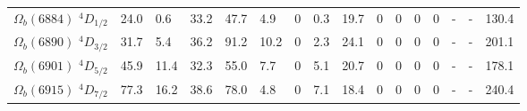 \begin{tabular}{c |  p{0.58cm}  p{0.58cm}  p{0.58cm}  p{0.58cm}  p{0.58cm}  p{0.58cm}  p{0.58cm}  p{0.58cm}  p{0.58cm}  p{0.58cm}  p{0.58cm}  p{0.58cm}  p{0.58cm}  p{0.58cm}p{0.75cm}}
$\Omega_b(6884)$ $^{4}D_{1/2}$&24.0   &0.6   &33.2   &47.7   &4.9   &$0$   &0.3   &19.7   &$0$   &$0$   &$0$   &$0$   &-   &-   &130.4  \\
$\Omega_b(6890)$ $^{4}D_{3/2}$&31.7   &5.4   &36.2   &91.2   &10.2   &$0$   &2.3   &24.1   &$0$   &$0$   &$0$   &$0$   &-   &-   &201.1  \\
$\Omega_b(6901)$ $^{4}D_{5/2}$&45.9   &11.4   &32.3   &55.0   &7.7   &$0$   &5.1   &20.7   &$0$   &$0$   &$0$   &$0$   &-   &-   &178.1  \\
$\Omega_b(6915)$ $^{4}D_{7/2}$&77.3   &16.2   &38.6   &78.0   &4.8   &$0$   &7.1   &18.4   &$0$   &$0$   &$0$   &$0$   &-   &-   &240.4  \\
\hline \hline
\end{tabular}
